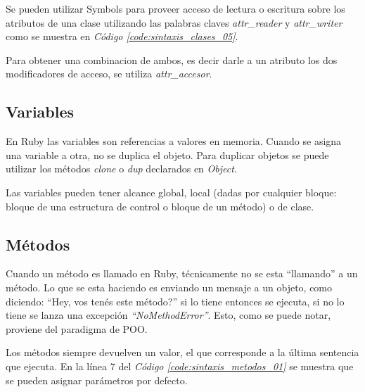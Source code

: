 \documentclass{article}
\newcommand{\refcode}[1]{\textit{Código \ref{#1}}}
\begin{document}
 
\bigskip

 
\bigskip

Se pueden utilizar Symbols para proveer acceso de lectura o escritura sobre los atributos de una clase utilizando las palabras claves \textit{attr\_reader} y \textit{attr\_writer} como se muestra en \refcode{code:sintaxis_clases_05}.   

 
\bigskip

Para obtener una combinacion de ambos, es decir darle a un atributo los dos modificadores de acceso, se utiliza \textit{attr\_accesor}.
\bigskip



\subsection{Variables}
	
	En Ruby las variables son referencias a valores en memoria. Cuando se asigna una variable a otra, no se duplica el objeto. Para duplicar objetos se puede utilizar los métodos \textit{clone} o \textit{dup} declarados en \textit{Object}.
	\par
	Las variables pueden tener alcance global, local (dadas por cualquier bloque: bloque de una estructura de control o bloque de un método) o de clase.

 
\bigskip



\subsection{Métodos}

	Cuando un método es llamado en Ruby, técnicamente no se esta “llamando” a un método. Lo que se esta haciendo es enviando un mensaje a un objeto, como diciendo: “Hey, vos tenés este método?” si lo tiene entonces se ejecuta, si no lo tiene se lanza una excepción \textit{“NoMethodError”}. Esto, como se puede notar, proviene del paradigma de POO.
	\par
	Los métodos siempre devuelven un valor, el que corresponde a la última sentencia que ejecuta. En la línea 7 del \refcode{code:sintaxis_metodos_01} se muestra que se pueden asignar parámetros por defecto.
\bigskip
\end{document}
